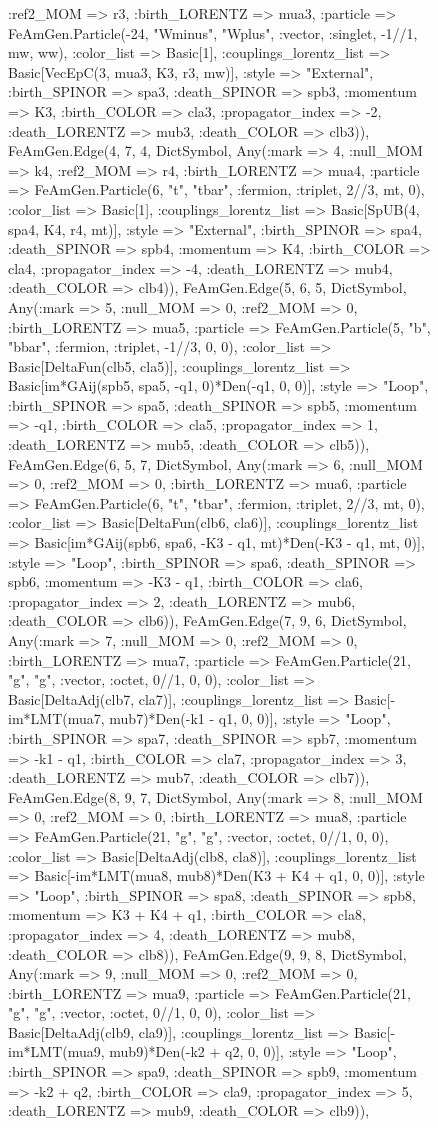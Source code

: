 \documentclass{revtex4}
\begin{document}
\begin{figure}[!htb]
\begin{center}
{:ref2_MOM => r3, :birth_LORENTZ => mua3, :particle => FeAmGen.Particle(-24, "Wminus", "Wplus", :vector, :singlet, -1//1, mw, ww), :color_list => Basic[1], :couplings_lorentz_list => Basic[VecEpC(3, mua3, K3, r3, mw)], :style => "External", :birth_SPINOR => spa3, :death_SPINOR => spb3, :momentum => K3, :birth_COLOR => cla3, :propagator_index => -2, :death_LORENTZ => mub3, :death_COLOR => clb3)), FeAmGen.Edge(4, 7, 4, Dict{Symbol, Any}(:mark => 4, :null_MOM => k4, :ref2_MOM => r4, :birth_LORENTZ => mua4, :particle => FeAmGen.Particle(6, "t", "tbar", :fermion, :triplet, 2//3, mt, 0), :color_list => Basic[1], :couplings_lorentz_list => Basic[SpUB(4, spa4, K4, r4, mt)], :style => "External", :birth_SPINOR => spa4, :death_SPINOR => spb4, :momentum => K4, :birth_COLOR => cla4, :propagator_index => -4, :death_LORENTZ => mub4, :death_COLOR => clb4)), FeAmGen.Edge(5, 6, 5, Dict{Symbol, Any}(:mark => 5, :null_MOM => 0, :ref2_MOM => 0, :birth_LORENTZ => mua5, :particle => FeAmGen.Particle(5, "b", "bbar", :fermion, :triplet, -1//3, 0, 0), :color_list => Basic[DeltaFun(clb5, cla5)], :couplings_lorentz_list => Basic[im*GAij(spb5, spa5, -q1, 0)*Den(-q1, 0, 0)], :style => "Loop", :birth_SPINOR => spa5, :death_SPINOR => spb5, :momentum => -q1, :birth_COLOR => cla5, :propagator_index => 1, :death_LORENTZ => mub5, :death_COLOR => clb5)), FeAmGen.Edge(6, 5, 7, Dict{Symbol, Any}(:mark => 6, :null_MOM => 0, :ref2_MOM => 0, :birth_LORENTZ => mua6, :particle => FeAmGen.Particle(6, "t", "tbar", :fermion, :triplet, 2//3, mt, 0), :color_list => Basic[DeltaFun(clb6, cla6)], :couplings_lorentz_list => Basic[im*GAij(spb6, spa6, -K3 - q1, mt)*Den(-K3 - q1, mt, 0)], :style => "Loop", :birth_SPINOR => spa6, :death_SPINOR => spb6, :momentum => -K3 - q1, :birth_COLOR => cla6, :propagator_index => 2, :death_LORENTZ => mub6, :death_COLOR => clb6)), FeAmGen.Edge(7, 9, 6, Dict{Symbol, Any}(:mark => 7, :null_MOM => 0, :ref2_MOM => 0, :birth_LORENTZ => mua7, :particle => FeAmGen.Particle(21, "g", "g", :vector, :octet, 0//1, 0, 0), :color_list => Basic[DeltaAdj(clb7, cla7)], :couplings_lorentz_list => Basic[-im*LMT(mua7, mub7)*Den(-k1 - q1, 0, 0)], :style => "Loop", :birth_SPINOR => spa7, :death_SPINOR => spb7, :momentum => -k1 - q1, :birth_COLOR => cla7, :propagator_index => 3, :death_LORENTZ => mub7, :death_COLOR => clb7)), FeAmGen.Edge(8, 9, 7, Dict{Symbol, Any}(:mark => 8, :null_MOM => 0, :ref2_MOM => 0, :birth_LORENTZ => mua8, :particle => FeAmGen.Particle(21, "g", "g", :vector, :octet, 0//1, 0, 0), :color_list => Basic[DeltaAdj(clb8, cla8)], :couplings_lorentz_list => Basic[-im*LMT(mua8, mub8)*Den(K3 + K4 + q1, 0, 0)], :style => "Loop", :birth_SPINOR => spa8, :death_SPINOR => spb8, :momentum => K3 + K4 + q1, :birth_COLOR => cla8, :propagator_index => 4, :death_LORENTZ => mub8, :death_COLOR => clb8)), FeAmGen.Edge(9, 9, 8, Dict{Symbol, Any}(:mark => 9, :null_MOM => 0, :ref2_MOM => 0, :birth_LORENTZ => mua9, :particle => FeAmGen.Particle(21, "g", "g", :vector, :octet, 0//1, 0, 0), :color_list => Basic[DeltaAdj(clb9, cla9)], :couplings_lorentz_list => Basic[-im*LMT(mua9, mub9)*Den(-k2 + q2, 0, 0)], :style => "Loop", :birth_SPINOR => spa9, :death_SPINOR => spb9, :momentum => -k2 + q2, :birth_COLOR => cla9, :propagator_index => 5, :death_LORENTZ => mub9, :death_COLOR => clb9)), }
\end{center}
\end{figure}
\end{document}
